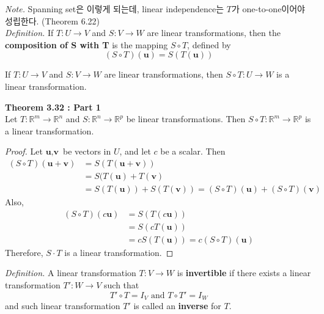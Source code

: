 \textit{Note.} Spanning set은 이렇게 되는데, linear independence는 $T$가 one-to-one이어야 성립한다. (Theorem 6.22) \\

\textit{Definition.} If $T: U \rightarrow V$ and $S: V \rightarrow W$ are linear transformations, then the \textbf{composition of S with T} is the mapping $S \circ T$, defined by \begin{equation*}
	(S \circ T)(\textbf{u}) = S(T(\textbf{u}))
\end{equation*}

\begin{theorem}
	If $T: U \rightarrow V$ and $S: V \rightarrow W$ are linear transformations, then $S \circ T: U \rightarrow W$ is a linear transformation.
\end{theorem}

\textbf{Theorem 3.32 : Part 1} \\
 Let $T: \mathbb{R}^m \rightarrow \mathbb{R}^n$ and $S: \mathbb{R}^n \rightarrow \mathbb{R}^p$ be linear transformations. Then $S \circ T: \mathbb{R}^m \rightarrow \mathbb{R}^p$ is a linear transformation. \\

\begin{proof}
	Let $\textbf{u}, \textbf{v}$ be vectors in $U$, and let $c$ be a scalar. Then \begin{align*}
		(S \circ T)(\textbf{u} + \textbf{v}) &= S(T(\textbf{u} + \textbf{v})) \\
		&= S(T(\textbf{u}) + T(\textbf{v}) \\
		&= S(T(\textbf{u})) + S(T(\textbf{v})) = (S \circ T)(\textbf{u}) + (S \circ T)(\textbf{v})
	\end{align*}
	Also, \begin{align*}
		(S \circ T)(c\textbf{u}) &= S(T(c\textbf{u})) \\
		&= S(cT(\textbf{u})) \\
		&= cS(T(\textbf{u})) = c(S \circ T)(\textbf{u})
	\end{align*}
	Therefore, $S \cdot T$ is a linear transformation.
\end{proof}

\textit{Definition.} A linear transformation $T: V \rightarrow W$ is \textbf{invertible} if there exists a linear transformation $T': W \rightarrow V$ such that \begin{equation*}
	T' \circ T = I_V \mbox{ and } T \circ T' = I_W
\end{equation*} and such linear transformation $T'$ is called an \textbf{inverse} for $T$.

